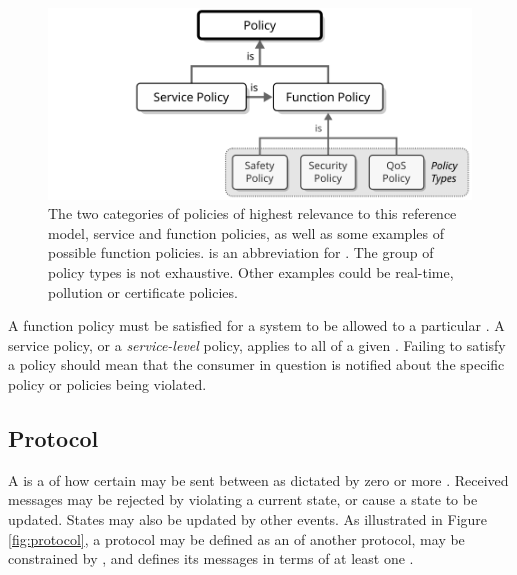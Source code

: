 \begin{figure}[ht!]
  \centering
  \includegraphics[scale=0.9]{figures/policy}
  \caption{
    The two categories of policies of highest relevance to this reference model, service and function policies, as well as some examples of possible function policies.
     is an abbreviation for .
    The group of policy types is not exhaustive.
    Other examples could be real-time, pollution or certificate policies.
  }
  \label{fig:policy}
\end{figure}

A function policy must be satisfied for a system to be allowed to  a particular .
A service policy, or a \textit{service-level} policy, applies to all  of a given .
Failing to satisfy a policy should mean that the consumer in question is notified about the specific policy or policies being violated.

\subsection{Protocol}
\label{sec:reference-model:protocol}

A  is a  of how certain  may be sent between  as dictated by zero or more .
Received messages may be rejected by violating a current state, or cause a state to be updated.
States may also be updated by other events. 
As illustrated in Figure \ref{fig:protocol}, a protocol may be defined as an  of another protocol, may be constrained by , and defines its messages in terms of at least one .

